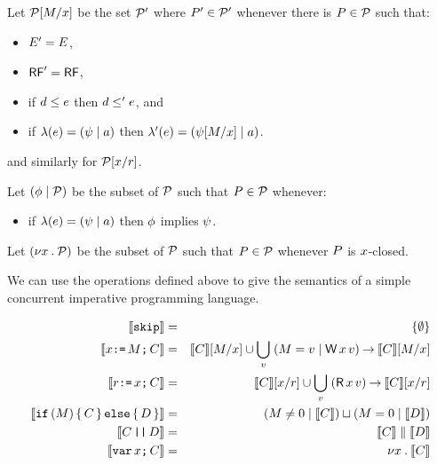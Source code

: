 \begin{definition}
Let $\mathcal{P}[M/x]$ be the set $\mathcal{P}'$ where $P'\in\mathcal{P}'$ whenever
there is $P\in\mathcal{P}$ such that:
\begin{itemize}
\item $E' = E$,
\item $\mathsf{RF}' = \mathsf{RF}$,
\item if $d \le e$ then $d \le' e$, and
\item if $\lambda(e) = (\psi \mid a)$ then $\lambda'(e) = (\psi[M/x] \mid a)$.
\end{itemize}
and similarly for $\mathcal{P}[x/r]$.
\end{definition}

\begin{definition}
Let $(\phi \mid \mathcal{P})$ be the subset of $\mathcal{P}$ such that $P\in\mathcal{P}$ whenever:
\begin{itemize}
\item if $\lambda(e) = (\psi \mid a)$ then $\phi$ implies $\psi$.
\end{itemize}
\end{definition}

\begin{definition}
Let $(\nu x\mathbin.\mathcal{P})$ be the subset of $\mathcal{P}$ such that $P\in\mathcal{P}$ whenever
$P$ is $x$-closed.
\end{definition}

We can use the operations defined above to give the
semantics of a simple concurrent imperative programming language.

\begin{definition}
\begin{eqnarray*}
  \sem{\SKIP} & = & \{ \emptyset \} \\
  \sem{\aLoc\GETS\aExp\SEMI \aCmd} & = & \sem{\aCmd}[\aExp/\aLoc] \cup \bigcup_\aVal\; (\aExp=\aVal \mid \DW\aLoc\aVal) \prefix \sem{\aCmd}[\aExp/\aLoc] \\
  \sem{\aReg\GETS\aLoc\SEMI \aCmd} & = & \sem{\aCmd}[\aLoc/\aReg] \cup \bigcup_\aVal\; (\DR\aLoc\aVal) \prefix \sem{\aCmd}[\aLoc/\aReg] \\
  \sem{\IF (\aExp) \THEN \aCmd \ELSE \bCmd \FI} & = & (\aExp \neq 0 \mid \sem{\aCmd}) \sqcup (\aExp=0 \mid \sem{\bCmd}) \\
  \sem{\aCmd \PAR \bCmd} & = & \sem{\aCmd} \parallel \sem{\bCmd} \\
  \sem{\VAR\aLoc\SEMI \aCmd} & = & \nu \aLoc \st \sem{\aCmd}
\end{eqnarray*}
\end{definition}

